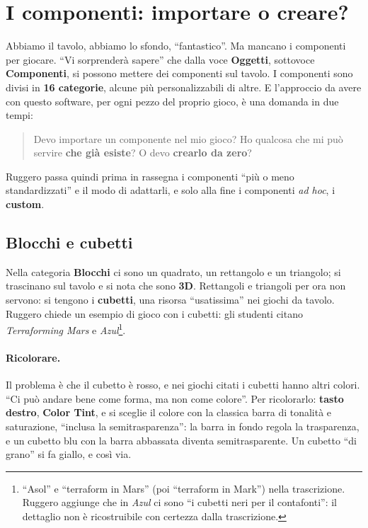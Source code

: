 \section{I componenti: importare o creare?}
\label{a8:sec:componenti}

Abbiamo il tavolo, abbiamo lo sfondo, ``fantastico''. Ma mancano i componenti per
giocare. ``Vi sorprenderà sapere'' che dalla voce \textbf{Oggetti}, sottovoce
\textbf{Componenti}, si possono mettere dei componenti sul tavolo. I componenti sono
divisi in \textbf{16 categorie}, alcune più personalizzabili di altre. E l'approccio da
avere con questo software, per ogni pezzo del proprio gioco, è una domanda in due
tempi:

\begin{quote}
Devo importare un componente nel mio gioco? Ho qualcosa che mi può servire
\textbf{che già esiste}? O devo \textbf{crearlo da zero}?
\end{quote}

Ruggero passa quindi prima in rassegna i componenti ``più o meno standardizzati'' e il
modo di adattarli, e solo alla fine i componenti \emph{ad hoc}, i \textbf{custom}.

\subsection{Blocchi e cubetti}
\label{a8:sec:cubetti}

Nella categoria \textbf{Blocchi} ci sono un quadrato, un rettangolo e un triangolo; si
trascinano sul tavolo e si nota che sono \textbf{3D}. Rettangoli e triangoli per ora
non servono: si tengono i \textbf{cubetti}, una risorsa ``usatissima'' nei giochi da
tavolo. Ruggero chiede un esempio di gioco con i cubetti: gli studenti citano
\emph{Terraforming Mars} e \emph{Azul}\footnote{``Asol'' e ``terraform in Mars'' (poi
``terraform in Mark'') nella trascrizione. Ruggero aggiunge che in \emph{Azul} ci sono
``i cubetti neri per il contafonti'': il dettaglio non è ricostruibile con certezza
dalla trascrizione.}.

\paragraph{Ricolorare.} Il problema è che il cubetto è rosso, e nei giochi citati i
cubetti hanno altri colori. ``Ci può andare bene come forma, ma non come colore''. Per
ricolorarlo: \textbf{tasto destro}, \textbf{Color Tint}, e si sceglie il colore con la
classica barra di tonalità e saturazione, ``inclusa la semitrasparenza'': la barra in
fondo regola la trasparenza, e un cubetto blu con la barra abbassata diventa
semitrasparente. Un cubetto ``di grano'' si fa giallo, e così via.

